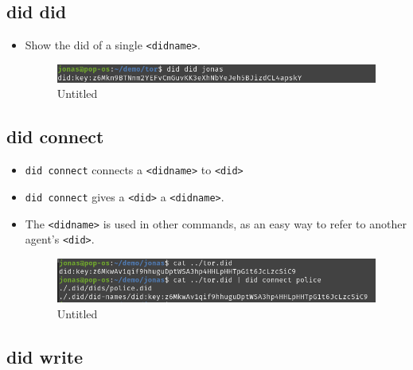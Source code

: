 \hypertarget{did-did}{%
\subsection{\texorpdfstring{did did }{did did }}\label{did-did}}

\begin{itemize}
\item
  Show the did of a single \lstinline!<didname>!.

  \begin{figure}
  \centering
  \includegraphics{User Interface f8759a9462b24d5f95cf6123d68b89ea/Untitled 4.png}
  \caption{Untitled}
  \end{figure}
\end{itemize}

\hypertarget{did-connect}{%
\subsection{\texorpdfstring{did connect
}{did connect  }}\label{did-connect}}

\begin{itemize}
\item
  \lstinline!did connect! connects a
  \lstinline!<didname>! to \lstinline!<did>!
\item
  \lstinline!did connect! gives a
  \lstinline!<did>! a \lstinline!<didname>!.
\item
  The \lstinline!<didname>! is used in other commands, as
  an easy way to refer to another agent's
  \lstinline!<did>!.

  \begin{figure}
  \centering
  \includegraphics{User Interface f8759a9462b24d5f95cf6123d68b89ea/Untitled 5.png}
  \caption{Untitled}
  \end{figure}
\end{itemize}

\hypertarget{did-write}{%
\subsection{\texorpdfstring{did write }{did write  }}\label{did-write}}

